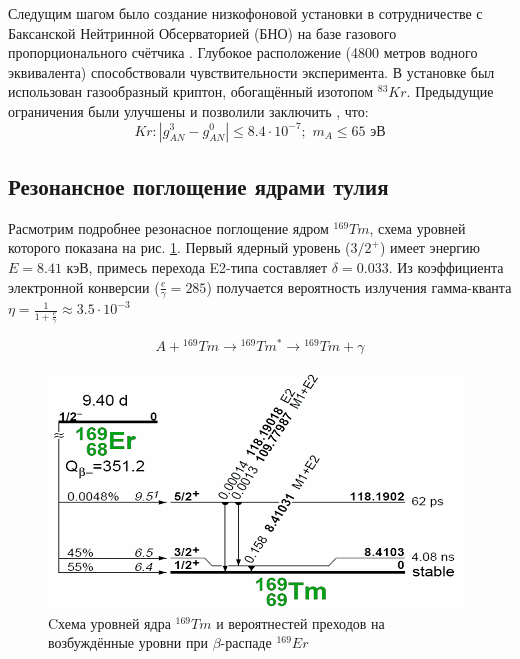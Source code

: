 \documentclass[a4paper,article,14pt]{extarticle}
\begin{document}
Следущим шагом было создание низкофоновой установки в сотрудничестве с Баксанской Нейтринной Обсерваторией (БНО) на базе газового пропорционального счётчика \cite{83Kr}. Глубокое расположение (4800 метров водного эквивалента) способствовали чувствительности эксперимента. В установке был использован газообразный криптон, обогащённый изотопом $^{83}Kr$. Предыдущие ограничения были улучшены \cite{Derbin_2017_Kr} и позволили заключить , что:
\begin{equation}
    Kr:\left| {g_{AN}^3 - g_{AN}^0} \right| \leqslant 8.4 \cdot {10^{ - 7}};\,\,{m_A} \leqslant 65 \text{ эВ}
\end{equation}

\subsection{Резонансное поглощение ядрами тулия}

Расмотрим подробнее резонасное поглощение ядром $^{169}Tm$, схема уровней  которого показана на рис. \ref{tmlvls}. Первый ядерный уровень ($3/2^+$) имеет энергию $E = 8.41 \text{ кэВ}$, примесь перехода E2-типа составляет $\delta = 0.033$. Из коэффициента электронной конверсии ($\frac{e}{\gamma} = 285$) \cite{lederer1978table} получается вероятность излучения гамма-кванта $\eta = \frac{1}{1 + \frac{e}{\gamma}} \approx 3.5 \cdot 10^{-3}$

\begin{equation}
    A + {}^{169}Tm \rightarrow {}^{169}Tm^{*} \rightarrow {}^{169}Tm + \gamma
\end{equation}

\begin{figure}[h]
    \centering
    \includegraphics[width = 0.75 \textwidth]{images/Tmlevels.png}
    \caption{Cхема уровней ядра $^{169}Tm$ и вероятнестей преходов на возбуждённые уровни при $\beta$-распаде $^{169}Er$}
    \label{tmlvls}
\end{figure}
\end{document}
